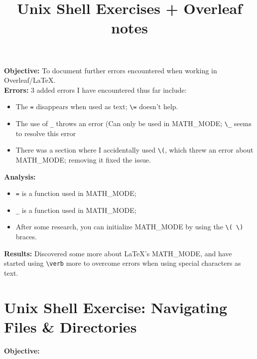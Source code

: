 \documentclass{article}
\begin{document}
\textbf{Objective:} To document further errors encountered when working in Overleaf/LaTeX. \\
\textbf{Errors:} 3 added errors I have encountered thus far include:
\begin{itemize}
    \item The \verb|=| disappears when used as text; \verb|\=| doesn't help.
    \item The use of \verb|_| throws an error (Can only be used in MATH\_MODE; \verb|\_| seems to resolve this error
    \item There was a section where I accidentally used \verb|\(|, which threw an error about MATH\_MODE; removing it fixed the issue.
\end{itemize}
\textbf{Analysis:}
\begin{itemize}
    \item \verb|=| is a function used in MATH\_MODE;
    \item \verb|_| is a function used in MATH\_MODE;
    \item After some research, you can initialize MATH\_MODE by using the \verb|\( \)| braces.
\end{itemize}
\textbf{Results:} Discovered some more about LaTeX's MATH\_MODE, and have \\started using \verb|\verb| more to overcome errors when using special characters as text.
\newpage
\title{Unix Shell Exercises + Overleaf notes}
\maketitle
\newpage
\section*{Unix Shell Exercise: Navigating Files \& Directories}
\textbf{Objective:}
\end{document}
